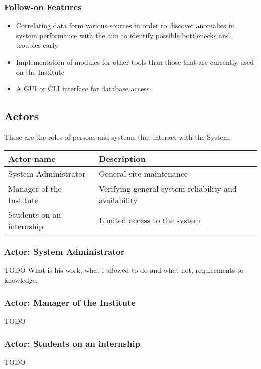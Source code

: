 \documentclass[12pt]{article}
\begin{document}
\subsubsection{Follow-on Features}
\begin{itemize}
    \item Correlating data form various sources in order to discover anomalies
        in system performance with the aim to identify possible bottlenecks and
        troubles early
	  \item Implementation of modules for other tools than those that are currently used on the Institute
    \item A GUI or CLI interface for database access
\end{itemize}

\subsection{Actors}
These are the roles of persons and systems that interact with the System.

\begin{center}
	\begin{tabular}{| p{5.5cm} | p{9.5cm} |}
		\hline
		\textbf{Actor name}		& \textbf{Description}\\
		\hline
		System Administrator	& General site maintenance\\
		\hline
		Manager of the Institute	& Verifying general system reliability and availability\\
		\hline
		Students on an internship	& Limited access to the system\\
		\hline
	\end{tabular}
	\label{tab:Actors}
\end{center}

\subsubsection{Actor: System Administrator}
TODO What is his work, what i allowed to do and what not, requirements to knowledge.

\subsubsection{Actor: Manager of the Institute}
TODO

\subsubsection{Actor: Students on an internship}
TODO
\end{document}
